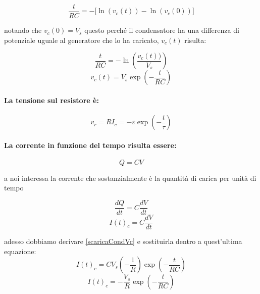 \begin{equation*}
    \frac{t}{RC} = -\Big[\ln(v_c(t)) - \ln(v_c(0))\Big]
\end{equation*}

notando che $v_c(0) = V_s$ questo perché il condensatore ha una differenza di potenziale uguale al generatore che lo ha caricato, $v_c(t)$ risulta:

\begin{equation*}
    \frac{t}{RC} = -\ln(\frac{v_c(t))}{V_s} )
\end{equation*}
\begin{equation}
   v_c(t) =  V_s\exp(-\frac{t}{RC})
   \label{scaricaCondVc}
\end{equation}

\paragraph{La tensione sul resistore è:}

\begin{equation}
    v_r = RI_c = -\varepsilon \exp(-\frac{t}{\tau})
\end{equation}

\paragraph{La corrente in funzione del tempo risulta essere:}

\begin{equation*}
    Q = CV
\end{equation*}

a noi interessa la corrente che sostanzialmente è la quantità di carica per unità di tempo

\begin{equation*}
    \frac{dQ}{dt} = C\frac{dV}{dt}
\end{equation*}
\begin{equation*}
    I(t)_c = C\frac{dV}{dt}
\end{equation*}

adesso dobbiamo derivare \ref{scaricaCondVc} e sostituirla dentro a quest'ultima equazione:
\begin{equation*}
    I(t)_c= CV_s(-\frac{1}{R})\exp(-\frac{t}{RC})
\end{equation*}
\begin{equation}
    I(t)_c = -\frac{V_s}{R}\exp(-\frac{t}{RC})
    \label{equazioneScaricaCondenatoreRC_COrrente}
\end{equation}




